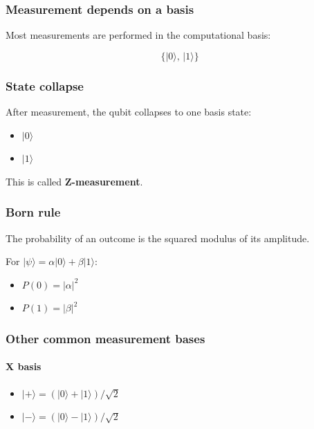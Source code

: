 \documentclass[
]{article}
\providecommand{\tightlist}{%
  \setlength{\itemsep}{0pt}\setlength{\parskip}{0pt}}
\begin{document}
\subsubsection{Measurement depends on a
basis}\label{measurement-depends-on-a-basis}

Most measurements are performed in the computational basis:

\[
\{|0\rangle,\,|1\rangle\}
\]

\subsubsection{State collapse}\label{state-collapse}

After measurement, the qubit collapses to one basis state:

\begin{itemize}
\tightlist
\item
  $|0\rangle$
\item
  $|1\rangle$
\end{itemize}

This is called \textbf{Z-measurement}.

\subsubsection{Born rule}\label{born-rule}

The probability of an outcome is the squared modulus of its amplitude.

For $|\psi\rangle = \alpha|0\rangle + \beta|1\rangle$:

\begin{itemize}
\tightlist
\item
  $P(0) = |\alpha|^2$
\item
  $P(1) = |\beta|^2$
\end{itemize}

\subsubsection{Other common measurement
bases}\label{other-common-measurement-bases}

\paragraph{X basis}\label{x-basis}

\begin{itemize}
\tightlist
\item
  $|+\rangle = (|0\rangle + |1\rangle)/\sqrt{2}$
\item
  $|-\rangle = (|0\rangle - |1\rangle)/\sqrt{2}$
\end{itemize}
\end{document}
